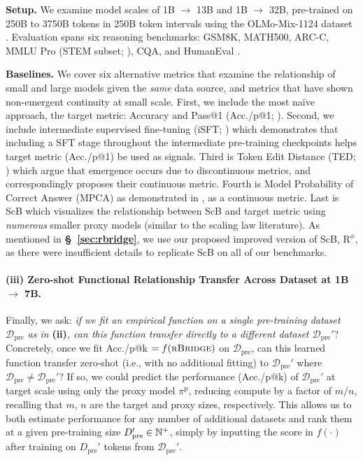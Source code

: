 \textbf{Setup.} We examine model scales of 1B $\rightarrow$ 13B and 1B $\rightarrow$ 32B, pre-trained on 250B to 3750B tokens in 250B token intervals using the OLMo-Mix-1124 dataset \citep{olmo20242}. Evaluation spans six reasoning benchmarks: GSM8K, MATH500, ARC-C, MMLU Pro (STEM subset; \cite{wang2024mmlupro}), CQA, and HumanEval \citep{chen2021evaluating}.

\textbf{Baselines.} We cover six alternative metrics that examine the relationship of small and large models given the \textit{same} data source, and metrics that have shown non-emergent continuity at small scale. First, we include the most naïve approach, the target metric: Accuracy and Pass@1 (Acc./p@1; \cite{NEURIPS2019_7298332f}). Second, we include intermediate supervised fine-tuning (iSFT; \cite{snell2024predicting}) which demonstrates that including a SFT stage throughout the intermediate pre-training checkpoints helps target metric (Acc./p@1) be used as signals. Third is Token Edit Distance (TED; \cite{NEURIPS2023_adc98a26}) which argue that emergence occurs due to discontinuous metrics, and correspondingly proposes their continuous metric. Fourth is Model Probability of Correct Answer (MPCA) as demonstrated in \cite{NEURIPS2023_adc98a26}, \cite{snell2024predicting} as a continuous metric. Last is ScB which visualizes the relationship between ScB and target metric using \textit{numerous} smaller proxy models (similar to the scaling law literature). As mentioned in \textbf{\S\ \ref{sec:rbridge}}, we use our proposed improved version of ScB, R$^\phi$, as there were insufficient details to replicate ScB on all of our benchmarks.

\paragraph{(iii) Zero-shot Functional Relationship Transfer Across Dataset at 1B $\rightarrow$ 7B.} 

Finally, we ask: \textit{if we fit an empirical function on a single pre-training dataset $\mathcal{D}_\text{pre}$ as in} \textbf{(ii)}\textit{, can this function transfer directly to a different dataset $\mathcal{D}_\text{pre}'$}? Concretely, once we fit Acc./p@k $=f(\textsc{rBridge})$ on $\mathcal{D}_\text{pre}$, can this learned function transfer zero-shot (i.e., with no additional fitting) to $\mathcal{D}_\text{pre}'$ where $\mathcal{D}_\text{pre} \neq \mathcal{D}_\text{pre}'$? If so, we could predict the performance (Acc./p@k) of $\mathcal{D}_\text{pre}'$ at target scale using only the proxy model $\pi^\text{p}$, reducing compute by a factor of $m/n$, recalling that $m$, $n$ are the target and proxy sizes, respectively. This allows us to both estimate performance for any number of additional datasets and rank them at a given pre-training size $D_\text{pre}' \in \mathbb{N}^+$, simply by inputting the  score in $f(\cdot)$ after training on $D_\text{pre}'$ tokens from $\mathcal{D}_\text{pre}'$.

